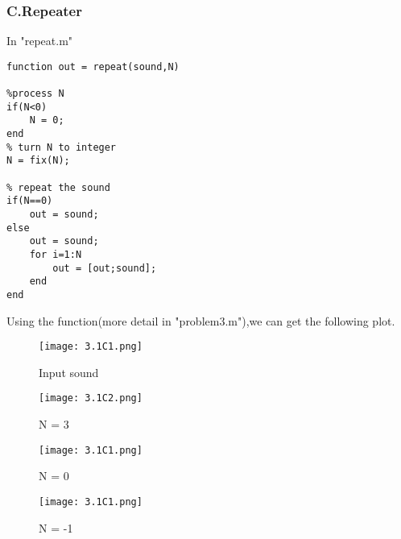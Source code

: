 \documentclass{article}
\begin{document}
\subsubsection*{C.Repeater}
In "repeat.m"
\begin{lstlisting}
function out = repeat(sound,N)

%process N
if(N<0)
    N = 0;
end
% turn N to integer
N = fix(N);

% repeat the sound
if(N==0)
    out = sound;
else
    out = sound;
    for i=1:N
        out = [out;sound];
    end
end
\end{lstlisting}
Using the function(more detail in "problem3.m"),we can get the following plot.
\begin{figure}[h]
    \begin{minipage}{0.45\textwidth}
        \centering
        \texttt{[image: 3.1C1.png]}
        \caption{Input sound}
    \end{minipage}
    \begin{minipage}{0.45\textwidth}
        \centering
        \texttt{[image: 3.1C2.png]}
        \caption{N = 3}
    \end{minipage}
    \quad

    \begin{minipage}{0.45\textwidth}
        \centering
        \texttt{[image: 3.1C1.png]}
        \caption{N = 0}
    \end{minipage}
    \begin{minipage}{0.45\textwidth}
        \centering
        \texttt{[image: 3.1C1.png]}
        \caption{N = -1}
    \end{minipage}
\end{figure}
\end{document}

